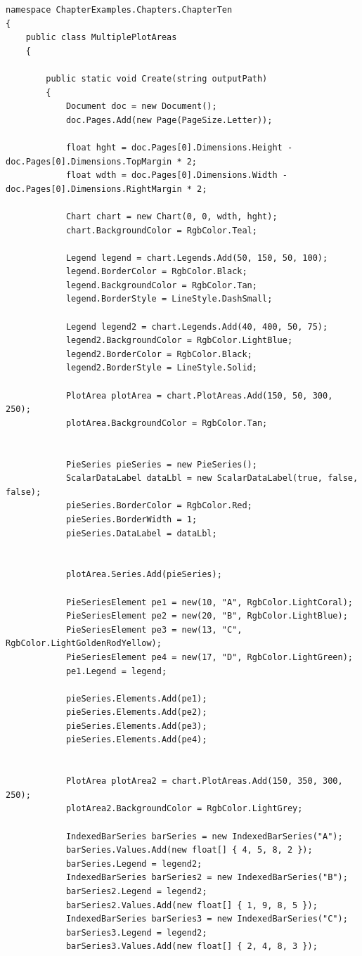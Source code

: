 \documentclass[american,letterpaper]{tufte-book}
\numberwithin{equation}{section}
\numberwithin{figure}{section}
\begin{document}
{\begin{lstlisting}[caption={A chart with two plot areas.},label={lis:two-plot-A-chart-with},basicstyle={\small\ttfamily},breaklines=true]
namespace ChapterExamples.Chapters.ChapterTen
{
    public class MultiplePlotAreas
    {

        public static void Create(string outputPath)
        {
            Document doc = new Document();
            doc.Pages.Add(new Page(PageSize.Letter));

            float hght = doc.Pages[0].Dimensions.Height - doc.Pages[0].Dimensions.TopMargin * 2;
            float wdth = doc.Pages[0].Dimensions.Width - doc.Pages[0].Dimensions.RightMargin * 2;

            Chart chart = new Chart(0, 0, wdth, hght);
            chart.BackgroundColor = RgbColor.Teal;

            Legend legend = chart.Legends.Add(50, 150, 50, 100);
            legend.BorderColor = RgbColor.Black;
            legend.BackgroundColor = RgbColor.Tan;
            legend.BorderStyle = LineStyle.DashSmall;

            Legend legend2 = chart.Legends.Add(40, 400, 50, 75);
            legend2.BackgroundColor = RgbColor.LightBlue;
            legend2.BorderColor = RgbColor.Black;
            legend2.BorderStyle = LineStyle.Solid;

            PlotArea plotArea = chart.PlotAreas.Add(150, 50, 300, 250);
            plotArea.BackgroundColor = RgbColor.Tan;


            PieSeries pieSeries = new PieSeries();
            ScalarDataLabel dataLbl = new ScalarDataLabel(true, false, false);
            pieSeries.BorderColor = RgbColor.Red;
            pieSeries.BorderWidth = 1;
            pieSeries.DataLabel = dataLbl;


            plotArea.Series.Add(pieSeries);

            PieSeriesElement pe1 = new(10, "A", RgbColor.LightCoral);
            PieSeriesElement pe2 = new(20, "B", RgbColor.LightBlue);
            PieSeriesElement pe3 = new(13, "C", RgbColor.LightGoldenRodYellow);
            PieSeriesElement pe4 = new(17, "D", RgbColor.LightGreen);
            pe1.Legend = legend;

            pieSeries.Elements.Add(pe1);
            pieSeries.Elements.Add(pe2);
            pieSeries.Elements.Add(pe3);
            pieSeries.Elements.Add(pe4);


            PlotArea plotArea2 = chart.PlotAreas.Add(150, 350, 300, 250);
            plotArea2.BackgroundColor = RgbColor.LightGrey;

            IndexedBarSeries barSeries = new IndexedBarSeries("A");
            barSeries.Values.Add(new float[] { 4, 5, 8, 2 });
            barSeries.Legend = legend2;
            IndexedBarSeries barSeries2 = new IndexedBarSeries("B");
            barSeries2.Legend = legend2;
            barSeries2.Values.Add(new float[] { 1, 9, 8, 5 });
            IndexedBarSeries barSeries3 = new IndexedBarSeries("C");
            barSeries3.Legend = legend2;
            barSeries3.Values.Add(new float[] { 2, 4, 8, 3 });


\end{lstlisting}}
\end{document}
